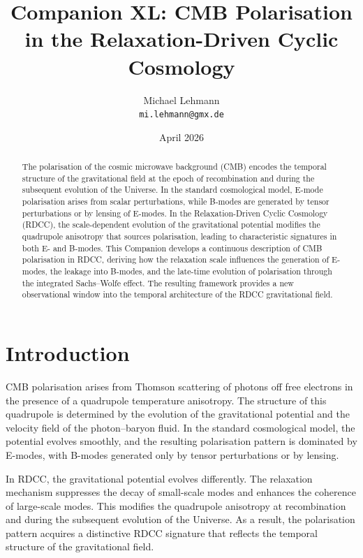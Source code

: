 \documentclass[11pt,a4paper]{article}
\title{\textbf{Companion XL: CMB Polarisation in the Relaxation-Driven Cyclic Cosmology}}
\author{Michael Lehmann \\ \texttt{mi.lehmann@gmx.de}}
\date{April 2026}
\begin{document}
\maketitle

\begin{abstract}
The polarisation of the cosmic microwave background (CMB) encodes the temporal 
structure of the gravitational field at the epoch of recombination and during the 
subsequent evolution of the Universe. In the standard cosmological model, E-mode 
polarisation arises from scalar perturbations, while B-modes are generated by 
tensor perturbations or by lensing of E-modes. In the Relaxation-Driven Cyclic 
Cosmology (RDCC), the scale-dependent evolution of the gravitational potential 
modifies the quadrupole anisotropy that sources polarisation, leading to 
characteristic signatures in both E- and B-modes. This Companion develops a 
continuous description of CMB polarisation in RDCC, deriving how the relaxation 
scale influences the generation of E-modes, the leakage into B-modes, and the 
late-time evolution of polarisation through the integrated Sachs–Wolfe effect. 
The resulting framework provides a new observational window into the temporal 
architecture of the RDCC gravitational field.
\end{abstract}
\section{Introduction}

CMB polarisation arises from Thomson scattering of photons off free electrons in 
the presence of a quadrupole temperature anisotropy. The structure of this 
quadrupole is determined by the evolution of the gravitational potential and the 
velocity field of the photon–baryon fluid. In the standard cosmological model, the 
potential evolves smoothly, and the resulting polarisation pattern is dominated by 
E-modes, with B-modes generated only by tensor perturbations or by lensing.

In RDCC, the gravitational potential evolves differently. The relaxation mechanism 
suppresses the decay of small-scale modes and enhances the coherence of large-scale 
modes. This modifies the quadrupole anisotropy at recombination and during the 
subsequent evolution of the Universe. As a result, the polarisation pattern 
acquires a distinctive RDCC signature that reflects the temporal structure of the 
gravitational field.
\end{document}
